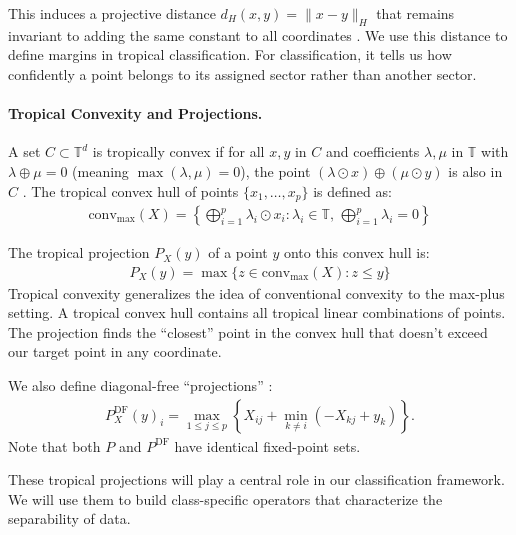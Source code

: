 \documentclass{article}
\newcommand{\trop}{\mathbb{T}}
\begin{document}
This induces a projective distance $d_H(x,y) = \|x - y\|_H$ that remains invariant to adding the same constant to all coordinates \cite{cohen2004}. We use this distance to define margins in tropical classification. For classification, it tells us how confidently a point belongs to its assigned sector rather than another sector.

\paragraph{Tropical Convexity and Projections.}
A set $C \subset \trop^d$ is tropically convex if for all $x,y$ in $C$ and coefficients $\lambda,\mu$ in $\trop$ with $\lambda \oplus \mu = 0$ (meaning $\max(\lambda,\mu)=0$), the point $(\lambda \odot x) \oplus (\mu \odot y)$ is also in $C$ \cite{cohen2004,develin2004}. The tropical convex hull of points $\{x_1,\ldots,x_p\}$ is defined as:
\begin{align}
\text{conv}_{\max}(X) = \left\{\bigoplus_{i=1}^p \lambda_i \odot x_i : \lambda_i \in \trop,\, \bigoplus_{i=1}^p \lambda_i = 0 \right\}
\end{align}

The tropical projection $P_X(y)$ of a point $y$ onto this convex hull is:
\begin{align}
P_X(y) = \max\{z \in \text{conv}_{\max}(X) : z \leq y\}
\end{align}
Tropical convexity generalizes the idea of conventional convexity to the max-plus setting. A tropical convex hull contains all tropical linear combinations of points. The projection finds the ``closest'' point in the convex hull that doesn't exceed our target point in any coordinate.

We also define diagonal-free ``projections'' \cite{gaubert2011}:
\begin{align}
P_X^{\text{DF}}(y)_i = \max_{1 \leq j \leq p} \left\{X_{ij} + \min_{k \neq i} (-X_{kj} + y_k)\right\}.
\end{align}
Note that both $P$ and $P^\text{DF}$ have identical fixed-point sets.

These tropical projections will play a central role in our classification framework. We will use them to build class-specific operators that characterize the separability of data.
\end{document}
